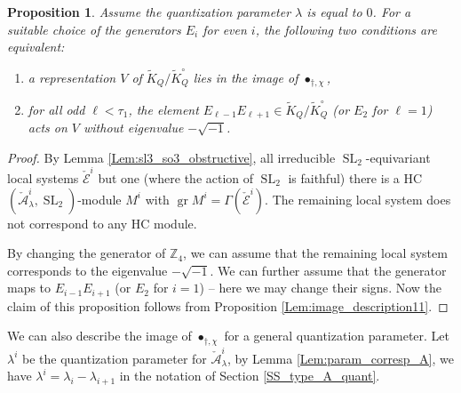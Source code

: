 \documentclass[12pt]{amsart}
\newcommand{\A}{\mathcal{A}}
\newcommand{\Z}{\mathbb{Z}}
\newcommand{\gr}{\operatorname{gr}}
\newtheorem{Prop}[Thm]{Proposition}
\theoremstyle{definition}
\numberwithin{equation}{section}
\begin{document}
\begin{Prop}\label{Prop:spin_HC_classif_canon}
Assume the quantization parameter $\lambda$ is equal to $0$.
For a suitable choice of the generators $E_i$ for even $i$, the following two conditions are
equivalent:
\begin{enumerate}
\item a representation
$V$ of $\tilde{K}_Q/\tilde{K}_Q^\circ$ lies in the image of $\bullet_{\dagger,\chi}$,
\item
for all odd $\ell<\tau_1$, the element $E_{\ell-1}E_{\ell+1}\in \tilde{K}_Q/\tilde{K}_Q^\circ$
(or $E_2$ for $\ell=1$) acts on $V$ without eigenvalue $-\sqrt{-1}$.
\end{enumerate}
\end{Prop}
\begin{proof}
By Lemma \ref{Lem:sl3_so3_obstructive}, all irreducible $\operatorname{SL}_2$-equivariant
local systems $\check{\mathcal{E}}^i$ but one (where the action of $\operatorname{SL}_2$ is faithful)
there is a HC $(\check{\A}^i_\lambda,\operatorname{SL}_2)$-module $M^i$ with
$\gr M^i=\Gamma(\check{\mathcal{E}}^i)$. The remaining local system does not correspond to any HC module.

By changing the generator of $\Z_4$, we can assume that the
remaining local system corresponds to the eigenvalue $-\sqrt{-1}$. We can further assume that
the generator maps to $E_{i-1}E_{i+1}$ (or $E_2$ for $i=1$) -- here we may change their signs.  Now the claim of this proposition
follows from Proposition \ref{Lem:image_description11}.
\end{proof}

We can also describe the image of $\bullet_{\dagger,\chi}$ for a general quantization parameter.
Let $\lambda^i$ be the quantization parameter for $\check{\A}^i_\lambda$, by Lemma
\ref{Lem:param_corresp_A}, we have $\lambda^i=\lambda_i-\lambda_{i+1}$ in the notation
of Section \ref{SS_type_A_quant}.
\end{document}
